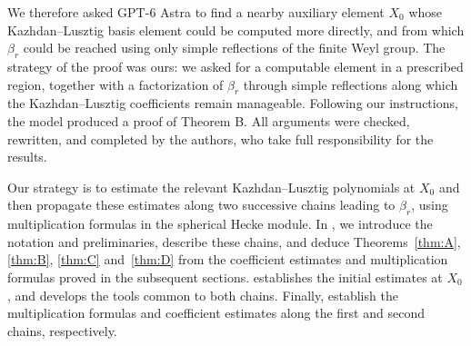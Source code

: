 \documentclass[11pt,a4paper,reqno]{amsart}
\numberwithin{equation}{section}
\theoremstyle{definition}
\theoremstyle{remark}
\theoremstyle{plain}
\begin{document}
We therefore asked GPT-6 Astra to find a nearby auxiliary element
$X_0$ whose Kazhdan--Lusztig basis element could be computed more
directly, and from which $\beta_r$ could be reached using only simple
reflections of the finite Weyl group. 
 The strategy of the proof was ours: we asked for a computable element in a prescribed region, together with a factorization of $\beta_r$ through simple reflections along which the Kazhdan–Lusztig coefficients remain manageable. Following our instructions, the model produced a proof of Theorem B.
 All arguments were checked, rewritten, and completed by the authors, who take full responsibility for the results.


\smallskip
{}
Our strategy is to estimate the relevant Kazhdan--Lusztig polynomials at $X_0$ and then propagate these estimates along two successive chains leading to $\beta_r$, using multiplication formulas in the spherical Hecke module.
In , we introduce the notation and preliminaries, describe these chains, and deduce
Theorems~\ref{thm:A}, \ref{thm:B}, \ref{thm:C} and~\ref{thm:D} from the coefficient estimates and multiplication formulas proved in the subsequent sections.
 establishes the initial estimates at $X_0$, and  develops the tools common to both chains.
Finally,  establish the multiplication formulas and coefficient estimates along the first and second chains, respectively.
\end{document}
